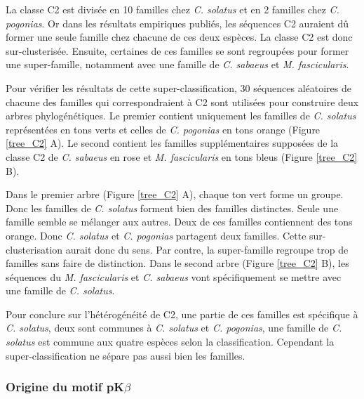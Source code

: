 \documentclass[12pt,a4paper]{article}
\begin{document}
		La classe C2 est divisée en 10 familles chez \textit{C. solatus} et en 2 familles chez \textit{C. pogonias}. Or dans les résultats empiriques publiés, les séquences C2 auraient dû former une seule famille chez chacune de ces deux espèces. La classe C2 est donc sur-clusterisée. Ensuite, certaines de ces familles se sont regroupées pour former une super-famille, notamment avec une famille de \textit{C. sabaeus} et \textit{M. fascicularis}.
		
		Pour vérifier les résultats de cette super-classification, 30 séquences aléatoires de chacune des familles qui correspondraient à  C2 sont utilisées pour construire deux arbres phylogénétiques. Le premier contient uniquement les familles de \textit{C. solatus} représentées en tons verts et celles de \textit{C. pogonias} en tons orange (Figure \ref{tree_C2} A). Le second contient les familles supplémentaires supposées de la classe C2 de \textit{C. sabaeus} en rose et \textit{M. fascicularis} en tons bleus (Figure \ref{tree_C2} B).
		
		Dans le premier arbre (Figure \ref{tree_C2} A), chaque ton vert forme un groupe. Donc les familles de \textit{C. solatus} forment bien des familles distinctes. Seule une famille semble se mélanger aux autres. Deux de ces familles contiennent des tons orange. Donc \textit{C. solatus} et \textit{C. pogonias} partagent deux familles. Cette sur-clusterisation aurait donc du sens. Par contre, la super-famille regroupe trop de familles sans faire de distinction. Dans le second arbre (Figure \ref{tree_C2} B), les séquences du \textit{M. fascicularis} et \textit{C. sabaeus} vont spécifiquement se mettre avec une famille de \textit{C. solatus}.	

		Pour conclure sur l'hétérogénéité de  C2, une partie de ces familles est spécifique à \textit{C. solatus}, deux sont communes à \textit{C. solatus} et \textit{C. pogonias}, une famille de \textit{C. solatus} est commune aux quatre espèces selon la classification. Cependant la super-classification ne sépare pas aussi bien les familles.
						
	\subsubsection{Origine du motif pK$\beta$}
	
\end{document}
